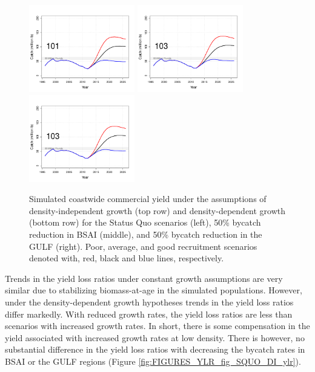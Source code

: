 \begin{figure}[htbp]
		\includegraphics[height=1.5in]{../FIGURES/fig_SQUO_DD_YBio.pdf}
		\includegraphics[height=1.5in]{../FIGURES/fig_BSAI_DD_YBio.pdf}
		\includegraphics[height=1.5in]{../FIGURES/fig_GULF_DD_YBio.pdf}
	\caption{Simulated coastwide commercial yield under the assumptions of density-independent growth (top row) and density-dependent growth (bottom row) for the Status Quo scenarios (left), 50\% bycatch reduction in BSAI (middle), and 50\% bycatch reduction in the GULF (right).  Poor, average, and good recruitment scenarios denoted with, red, black and blue lines, respectively.}
	\label{fig:FIGURES_fig_SQUO_DI_YBio}
\end{figure}

Trends in the yield loss ratios under constant growth assumptions are very similar due to stabilizing biomass-at-age in the simulated populations.  However, under the density-dependent growth hypotheses trends in the yield loss ratios differ markedly.  With reduced growth rates, the yield loss ratios are less than scenarios with increased growth rates.  In short, there is some compensation in the yield  associated with increased growth rates at low density.  There is however, no substantial difference in the yield loss ratios with decreasing the bycatch rates in BSAI or the GULF regions (Figure \ref{fig:FIGURES_YLR_fig_SQUO_DI_ylr}).

